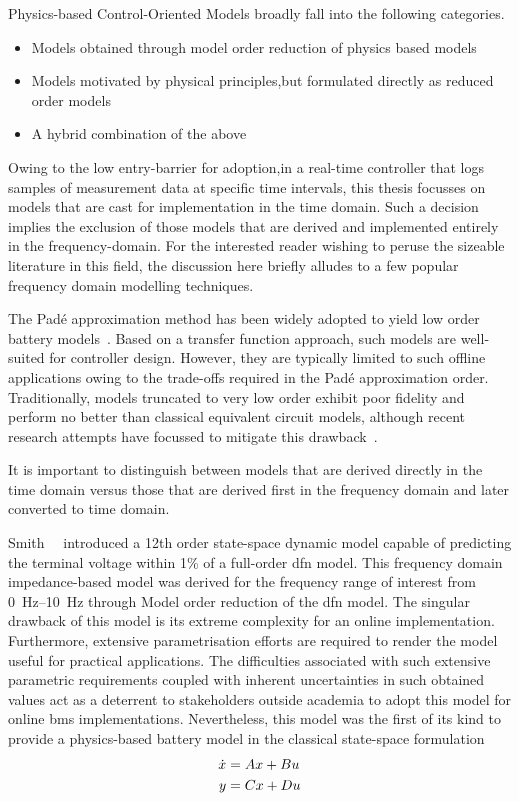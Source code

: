 Physics-based Control-Oriented Models broadly fall into the following categories.

\begin{itemize}
    \item Models obtained through model order reduction of physics based models
    \item Models motivated by physical principles,but formulated directly as reduced order models
    \item A hybrid combination of the above
\end{itemize}

Owing to the low entry-barrier for adoption,in a real-time controller that logs samples of
measurement data at specific time intervals, this thesis focusses on models that are cast for
implementation in the time domain. Such a decision implies the exclusion of those models that are
derived and implemented entirely in the frequency-domain. For the interested reader wishing to
peruse the sizeable literature in this field, the discussion here briefly alludes to a few popular
frequency domain modelling techniques.

The Padé approximation method has been widely adopted to yield low order battery
models~\cite{Forman2011}. Based on a transfer function
approach, such models are well-suited for controller design. However, they are typically limited to
such offline applications owing to the trade-offs required in the Padé approximation order.
Traditionally, models truncated to very low order exhibit poor fidelity and perform no better than
classical equivalent circuit models, although recent research attempts have focussed to mitigate
this drawback~\cite{Yuan2017a,Yuan2017}.


It is important to distinguish between models that are derived directly in the
time domain versus those that are derived first in the frequency domain and later converted to time
domain.

Smith~\etal{}~\cite{Smith2007} introduced a 12th order state-space dynamic model capable of
predicting the terminal voltage within 1\% of a full-order \gls{dfn} model. This frequency domain
impedance-based model was derived for the frequency range of interest from \SIrange{0}{10}{\hertz}
through Model order reduction of the \gls{dfn} model. The singular drawback of this model is its
extreme complexity for an online implementation. Furthermore, extensive parametrisation efforts are
required  to render
the model useful for practical applications. The difficulties associated with such extensive
parametric requirements coupled with inherent uncertainties in such obtained values act as a
deterrent to stakeholders outside academia to adopt this model for online \gls{bms} implementations.
Nevertheless, this model was the first of its kind to provide a physics-based battery model in the
classical state-space formulation
\begin{align}
    \dot{x} &= Ax + Bu \\\notag
    y &= Cx + Du
\end{align}

